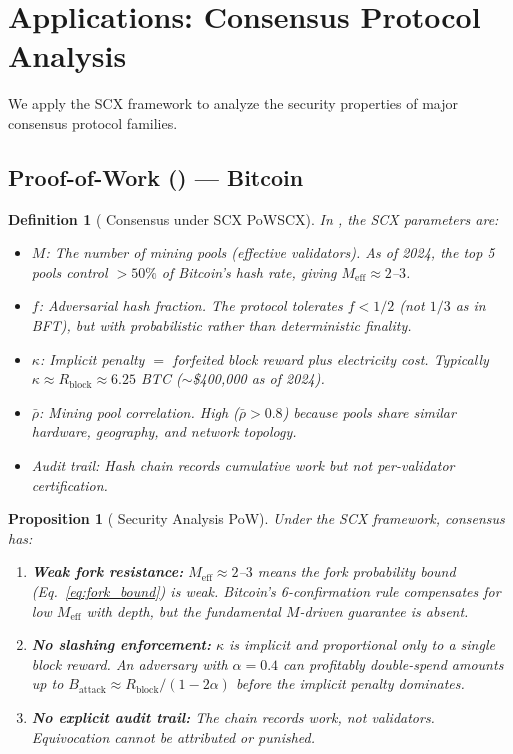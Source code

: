 \documentclass[11pt,a4paper]{article}
\newtheorem{proposition}[theorem]{Proposition}
\newtheorem{definition}[theorem]{Definition}
\theoremstyle{definition}
\newcommand{\SCX}{\textsc{SCX}}
\newcommand{\PoW}{\mathrm{PoW}}
\begin{document}
\section{Applications: Consensus Protocol Analysis}
\label{sec:applications}
We apply the \SCX{} framework to analyze the security properties of major consensus protocol families.
\subsection{Proof-of-Work (\PoW{}) — Bitcoin}
\begin{definition}[\PoW{} Consensus under \SCX{} PoWSCX]
\label{def:pow_scx}
In \PoW{}, the \SCX{} parameters are:
\begin{itemize}
    \item $M$: The number of mining pools (effective validators). As of 2024, the top 5 pools control $>50\%$ of Bitcoin's hash rate, giving $M_{\mathrm{eff}} \approx 2$--$3$.
    \item $f$: Adversarial hash fraction. The protocol tolerates $f < 1/2$ (not $1/3$ as in BFT), but with probabilistic rather than deterministic finality.
    \item $\kappa$: Implicit penalty $=$ forfeited block reward plus electricity cost. Typically $\kappa \approx R_{\mathrm{block}} \approx 6.25$ BTC ($\sim$\$400,000 as of 2024).
    \item $\bar{\rho}$: Mining pool correlation. High ($\bar{\rho} > 0.8$) because pools share similar hardware, geography, and network topology.
    \item Audit trail: Hash chain records cumulative work but not per-validator certification.
\end{itemize}
\end{definition}
\begin{proposition}[\PoW{} Security Analysis PoW]
\label{prop:pow_security}
Under the \SCX{} framework, \PoW{} consensus has:
\begin{enumerate}[label=(\roman*)]
    \item \textbf{Weak fork resistance:} $M_{\mathrm{eff}} \approx 2$--$3$ means the fork probability bound (Eq.~\ref{eq:fork_bound}) is weak. Bitcoin's 6-confirmation rule compensates for low $M_{\mathrm{eff}}$ with depth, but the fundamental $M$-driven guarantee is absent.
    \item \textbf{No slashing enforcement:} $\kappa$ is implicit and proportional only to a single block reward. An adversary with $\alpha = 0.4$ can profitably double-spend amounts up to $B_{\mathrm{attack}} \approx R_{\mathrm{block}} / (1 - 2\alpha)$ before the implicit penalty dominates.
    \item \textbf{No explicit audit trail:} The chain records work, not validators. Equivocation cannot be attributed or punished.
\end{enumerate}
\end{proposition}
\end{document}
